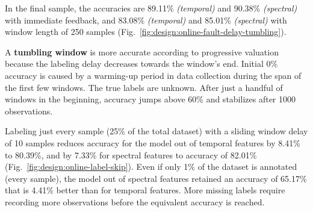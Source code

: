 In the final sample, the accuracies are 89.11\% \emph{(temporal)} and 90.38\% \emph{(spectral)} with immediate feedback, and 83.08\% \emph{(temporal)} and 85.01\% \emph{(spectral)} with window length of 250 samples (Fig.~\ref{fig:design:online-fault-delay-tumbling}). 


A \textbf{tumbling window} is more accurate according to progressive valuation because the labeling delay decreases towards the window's end. Initial 0\% accuracy is caused by a warming-up period in data collection during the span of the first few windows. The true labels are unknown. After just a handful of windows in the beginning, accuracy jumps above 60\% and stabilizes after 1000 observations.


 
Labeling just every  sample (25\% of the total dataset) with a sliding window delay of 10 samples reduces accuracy for the model out of temporal features by 8.41\% to 80.39\%, and by 7.33\% for spectral features to accuracy of 82.01\% (Fig.~\ref{fig:design:online-label-skip}). Even if only 1\% of the dataset is annotated (every  sample), the model out of spectral features retained an accuracy of 65.17\% that is 4.41\% better than for temporal features.  More missing labels require recording more observations before the equivalent accuracy is reached.


